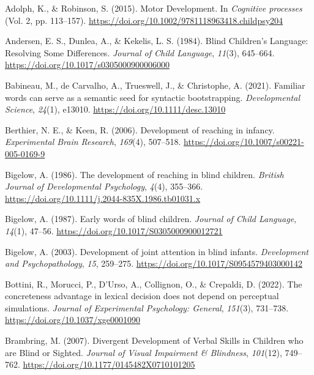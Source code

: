 \documentclass[
  man,floatsintext]{apa6}
\newlength{\cslhangindent}
\newlength{\cslentryspacingunit} %
\newenvironment{CSLReferences}[2] %
 {%
  \setlength{\parindent}{0pt}
  \ifodd #1
  \let\oldpar\par
  \def\par{\hangindent=\cslhangindent\oldpar}
  \fi
  \setlength{\parskip}{#2\cslentryspacingunit}
 }%
 {}
\begin{document}
\hypertarget{refs}{}
\begin{CSLReferences}{1}{0}
\leavevmode{}%
Adolph, K., \& Robinson, S. (2015). Motor {Development}. In \emph{Cognitive processes} (Vol. 2, pp. 113--157). \url{https://doi.org/10.1002/9781118963418.childpsy204}

\leavevmode{}%
Andersen, E. S., Dunlea, A., \& Kekelis, L. S. (1984). Blind {Children}'s {Language}: {Resolving Some Differences}. \emph{Journal of Child Language}, \emph{11}(3), 645--664. \url{https://doi.org/10.1017/s0305000900006000}

\leavevmode{}%
Babineau, M., de Carvalho, A., Trueswell, J., \& Christophe, A. (2021). Familiar words can serve as a semantic seed for syntactic bootstrapping. \emph{Developmental Science}, \emph{24}(1), e13010. \url{https://doi.org/10.1111/desc.13010}

\leavevmode{}%
Berthier, N. E., \& Keen, R. (2006). Development of reaching in infancy. \emph{Experimental Brain Research}, \emph{169}(4), 507--518. \url{https://doi.org/10.1007/s00221-005-0169-9}

\leavevmode{}%
Bigelow, A. (1986). The development of reaching in blind children. \emph{British Journal of Developmental Psychology}, \emph{4}(4), 355--366. \url{https://doi.org/10.1111/j.2044-835X.1986.tb01031.x}

\leavevmode{}%
Bigelow, A. (1987). Early words of blind children. \emph{Journal of Child Language}, \emph{14}(1), 47--56. \url{https://doi.org/10.1017/S0305000900012721}

\leavevmode{}%
Bigelow, A. (2003). Development of joint attention in blind infants. \emph{Development and Psychopathology}, \emph{15}, 259--275. \url{https://doi.org/10.1017/S0954579403000142}

\leavevmode{}%
Bottini, R., Morucci, P., D'Urso, A., Collignon, O., \& Crepaldi, D. (2022). The concreteness advantage in lexical decision does not depend on perceptual simulations. \emph{Journal of Experimental Psychology: General}, \emph{151}(3), 731--738. \url{https://doi.org/10.1037/xge0001090}

\leavevmode{}%
Brambring, M. (2007). Divergent {Development} of {Verbal Skills} in {Children} who are {Blind} or {Sighted}. \emph{Journal of Visual Impairment \& Blindness}, \emph{101}(12), 749--762. \url{https://doi.org/10.1177/0145482X0710101205}


\end{CSLReferences}
\end{document}

